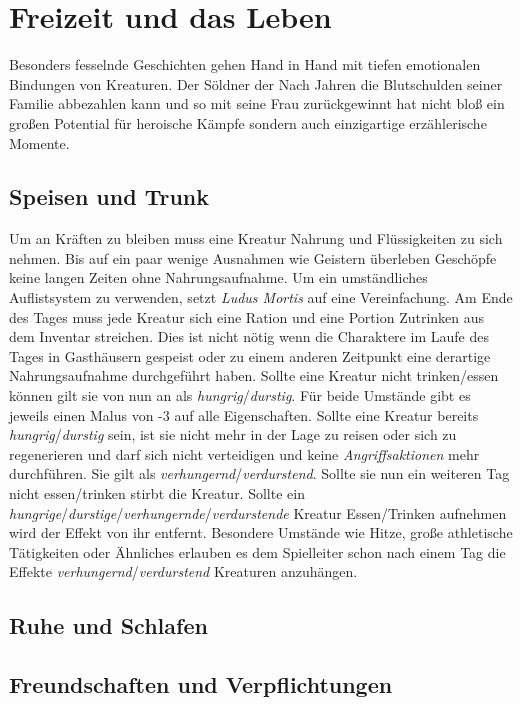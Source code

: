 \section{Freizeit und das Leben}
Besonders fesselnde Geschichten gehen Hand in Hand mit tiefen emotionalen Bindungen von Kreaturen. Der Söldner der Nach Jahren die Blutschulden seiner Familie abbezahlen kann und so mit seine Frau zurückgewinnt hat nicht bloß ein großen Potential für heroische Kämpfe sondern auch einzigartige erzählerische Momente.

\subsection*{Speisen und Trunk}
Um an Kräften zu bleiben muss eine Kreatur Nahrung und Flüssigkeiten zu sich nehmen. Bis auf ein paar wenige Ausnahmen wie Geistern überleben Geschöpfe keine langen Zeiten ohne Nahrungsaufnahme. Um ein umständliches Auflistsystem zu verwenden, setzt \textit{Ludus Mortis} auf eine Vereinfachung. Am Ende des Tages muss jede Kreatur sich eine Ration und eine Portion Zutrinken aus dem Inventar streichen. Dies ist nicht nötig wenn die Charaktere im Laufe des Tages in Gasthäusern gespeist oder zu einem anderen Zeitpunkt eine derartige Nahrungsaufnahme durchgeführt haben. Sollte eine Kreatur nicht trinken/essen können gilt sie von nun an als \textit{hungrig}/\textit{durstig}. Für beide Umstände gibt es jeweils einen Malus von -3 auf alle Eigenschaften. Sollte eine Kreatur bereits \textit{hungrig}/\textit{durstig} sein, ist sie nicht mehr in der Lage zu reisen oder sich zu regenerieren und darf sich nicht verteidigen und keine \textit{Angriffsaktionen} mehr durchführen. Sie gilt als \textit{verhungernd}/\textit{verdurstend}. Sollte sie nun ein weiteren Tag nicht essen/trinken stirbt die Kreatur. Sollte ein \textit{hungrige}/\textit{durstige}/\textit{verhungernde}/\textit{verdurstende} Kreatur Essen/Trinken aufnehmen wird der Effekt von ihr entfernt. Besondere Umstände wie Hitze, große athletische Tätigkeiten oder Ähnliches erlauben es dem Spielleiter schon nach einem Tag die Effekte \textit{verhungernd}/\textit{verdurstend} Kreaturen anzuhängen.

\subsection*{Ruhe und Schlafen}

\subsection*{Freundschaften und Verpflichtungen}

